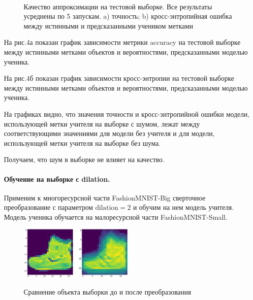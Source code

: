 \begin{figure}[h!t]\center
{}
\\
\caption{Качество аппроксимации на тестовой выборке. Все результаты усреднены по 5 запускам. a) точность; b) кросс-энтропийная ошибка между истинными и предсказанными учеником метками}
\end{figure}

На рис.4а показан график зависимости метрики accuracy на тестовой выборке между истинными метками объектов и вероятностями, предсказанными моделью ученика.

На рис.4б показан график зависимости кросс-энтропии на тестовой выборке между истинными метками объектов и вероятностями, предсказанными моделью ученика.

На графиках видно, что значения точности и кросс-энтропийной ошибки модели, использующей метки учителя на выборке с шумом, лежат между соответствующими значениями для модели без учителя и для модели, использующей метки учителя на выборке без шума.

Получаем, что шум в выборке не влияет на качество.

\paragraph{Обучение на выборке с dilation.}
Применим к многоресурсной части FashionMNIST-Big сверточное преобразование с параметром $\text{dilation}=2$ и обучим на нем модель учителя. Модель ученика обучается на малоресурсной части FashionMNIST-Small.

\begin{figure}[h!t]\center
{\includegraphics[width=0.5\textwidth]{results/dilation}}
\caption{Сравнение объекта выборки до и после преобразования}
\end{figure}\\

